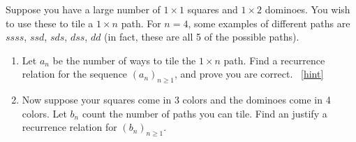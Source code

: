 \documentclass{book}
\begin{document}
\setcounter{project}{139}
\addtocounter{project}{-1}
\begin{activity}[]\label{act-dominoes}
\hypertarget{p-948}{}%
Suppose you have a large number of \(1\times 1\) squares and \(1 \times 2\) dominoes.  You wish to use these to tile a \(1 \times n\) path.  For \(n = 4\), some examples of different paths are \(ssss\), \(ssd\), \(sds\), \(dss\), \(dd\) (in fact, these are all 5 of the possible paths).%
\begin{enumerate}[font=\bfseries,label=(\alph*),ref=\alph*]
\item\label{task-174} \hypertarget{p-949}{}%
Let \(a_n\) be the number of ways to tile the \(1 \times n\) path.  Find a recurrence relation for the sequence \((a_n)_{n \ge 1}\), and prove you are correct.%
~\hfill{\tiny\hyperlink{a-139.a}{[hint]}\hypertarget{q-139.a}{}}\item\label{task-175} \hypertarget{p-951}{}%
Now suppose your squares come in 3 colors and the dominoes come in 4 colors.  Let \(b_n\) count the number of paths you can tile.  Find an justify a recurrence relation for \((b_n)_{n \ge 1}\).%
\end{enumerate}
\end{activity}
\end{document}
